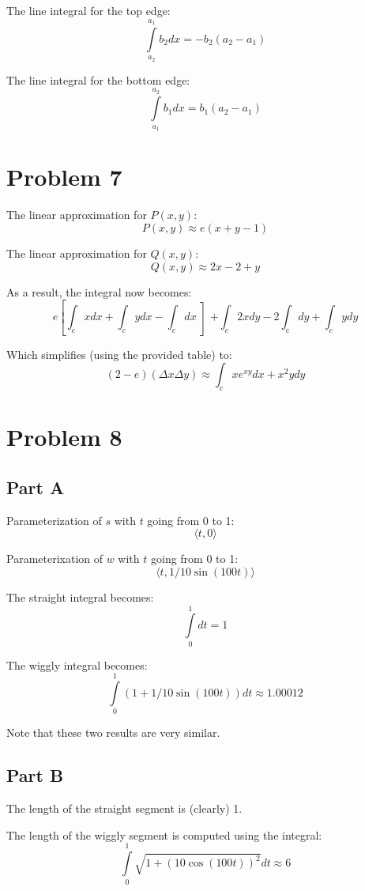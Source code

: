 \documentclass{article}
\begin{document}
The line integral for the top edge:
$$ \int\limits_{a_2}^{a_1} b_2 dx = -b_2(a_2 - a_1) $$

The line integral for the bottom edge:
$$ \int\limits_{a_1}^{a_2} b_1 dx = b_1(a_2 - a_1) $$

\section*{Problem 7}

The linear approximation for $P(x, y)$:
$$ P(x, y) \approx e(x + y - 1) $$

The linear approximation for $Q(x, y)$:
$$ Q(x, y) \approx 2x - 2 + y $$

As a result, the integral now becomes:
$$ e \left[ \int_c x dx + \int_c y dx - \int_c dx \left] + \int_c 2x dy - 2
\int_c dy + \int_c y dy $$

Which simplifies (using the provided table) to:
$$ (2 - e)(\Delta x \Delta y) \approx \int_c x e^{xy} dx + x^2 y dy $$

\section*{Problem 8}

\subsection*{Part A}

Parameterization of $s$ with $t$ going from 0 to 1:
$$ \langle t, 0 \rangle $$

Parameterixation of $w$ with $t$ going from 0 to 1:
$$ \langle t, 1/10 \sin \left( 100 t \right) \rangle $$

The straight integral becomes:
$$ \int\limits_0^1 dt = 1 $$

The wiggly integral becomes:
$$ \int\limits_0^1 (1 + 1/10 \sin \left( 100 t \right) ) dt \approx 1.00012 $$

Note that these two results are very similar.

\subsection*{Part B}

The length of the straight segment is (clearly) 1.

\bigbreak

The length of the wiggly segment is computed using the integral:
$$ \int\limits_0^1 \sqrt{1 + \left( 10 \cos \left( 100 t \right) \right)^2 } dt
\approx 6 $$
\end{document}
